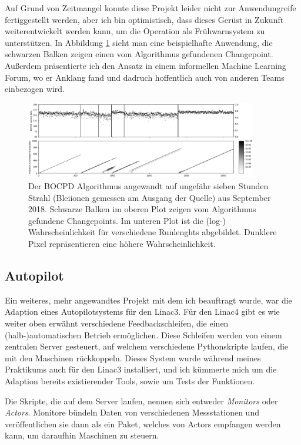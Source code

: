 \documentclass[11pt, a4paper, titlepage, headings=standardclasses]{scrartcl}
\begin{document}
Auf Grund von Zeitmangel konnte diese Projekt leider nicht zur Anwendungreife fertiggestellt werden, aber ich bin optimistisch, dass dieses Gerüst in Zukunft weiterentwickelt werden kann, um die Operation als Frühwarnsystem zu unterstützen. In Abbildung \ref{fig:bocd} sieht man eine beispielhafte Anwendung, die schwarzen Balken zeigen einen vom Algorithmus gefundenen Changepoint. Außerdem präsentierte ich den Ansatz in einem informellen Machine Learning Forum, wo er Anklang fand und dadruch hoffentlich auch von anderen Teams einbezogen wird.

\begin{figure}
    \centering
    \includegraphics[width=0.9\textwidth]{bocd_example.png}
    \caption{Der BOCPD Algorithmus angewandt auf ungefähr sieben Stunden Strahl (Bleiionen gemessen am Ausgang der Quelle) aus September 2018. Schwarze Balken im oberen Plot zeigen vom Algorithmus gefundene Changepoints. Im unteren Plot ist die (log-) Wahrscheinlichkeit für verschiedene Runlenghts abgebildet. Dunklere Pixel repräsentieren eine höhere Wahrscheinlichkeit.}
    \label{fig:bocd}
\end{figure}

\subsection*{Autopilot}

Ein weiteres, mehr angewandtes Projekt mit dem ich beauftragt wurde, war die Adaption eines Autopilotsystems für den Linac3. Für den Linac4 gibt es wie weiter oben erwähnt verschiedene Feedbackschleifen, die einen (halb-)automatischen Betrieb ermöglichen. Diese Schleifen werden von einem zentralen Server gesteuert, auf welchem verschiedene Pythonskripte laufen, die mit den Maschinen rückkoppeln. Dieses System wurde während meines Praktikums auch für den Linac3 installiert, und ich kümmerte mich um die Adaption bereits existierender Tools, sowie um Tests der Funktionen.

Die Skripte, die auf dem Server laufen, nennen sich entweder \textit{Monitors} oder \textit{Actors}. Monitore bündeln Daten von verschiedenen Messstationen und veröffentlichen sie dann als ein Paket, welches von Actors empfangen werden kann, um daraufhin Maschinen zu steuern. 
\end{document}
